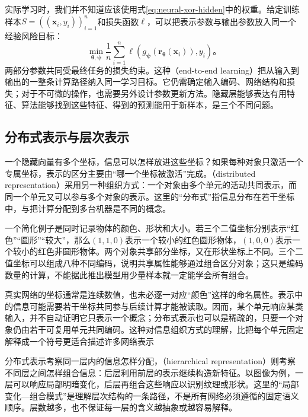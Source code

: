 实际学习时，我们并不知道应该使用式\eqref{eq:neural-xor-hidden}中的权重。给定训练样本$S=((\bm{x}_i,y_i))_{i=1}^{n}$和损失函数$\ell$，可以把表示参数与输出参数放入同一个经验风险目标：
\begin{equation}
  \min_{\bm{\theta},\bm{\psi}}
  \frac{1}{n}\sum_{i=1}^{n}
  \ell\!\left(g_{\bm{\psi}}(\bm{r}_{\bm{\theta}}(\bm{x}_i)),y_i\right)\text{。}
  \label{eq:neural-joint-learning}
\end{equation}
两部分参数共同受最终任务的损失约束。这种（end-to-end learning）把从输入到输出的一整条计算路径纳入同一学习目标。它仍需确定输入编码、网络结构和损失；对于不可微的操作，也需要另外设计参数更新方法。隐藏层能够表达有用特征、算法能够找到这些特征、得到的预测能用于新样本，是三个不同问题。

\subsection{分布式表示与层次表示}
\label{sec:neural-distributed-hierarchical}

一个隐藏向量有多个坐标，信息可以怎样放进这些坐标？如果每种对象只激活一个专属坐标，表示的区分主要由“哪一个坐标被激活”完成。（distributed representation）采用另一种组织方式：一个对象由多个单元的活动共同表示，而同一个单元又可以参与多个对象的表示。这里的“分布式”指信息分布在若干坐标中，与把计算分配到多台机器是不同的概念。

一个简化例子是同时记录物体的颜色、形状和大小。若三个二值坐标分别表示“红色”“圆形”“较大”，那么$(1,1,0)$表示一个较小的红色圆形物体，$(1,0,0)$表示一个较小的红色非圆形物体。两个对象共享部分坐标，又在形状坐标上不同。三个二值坐标可以组成八种不同编码，说明共享属性能够通过组合区分对象；这只是编码数量的计算，不能据此推出模型用少量样本就一定能学会所有组合。

真实网络的坐标通常是连续数值，也未必逐一对应“颜色”这样的命名属性。表示中的信息可能需要若干坐标共同参与后续计算才能被读取。因而，某个单元响应某类输入，并不自动证明它只表示一个概念；分布式表示也可以是稀疏的，只要一个对象仍由若干可复用单元共同编码。这种对信息组织方式的理解，比把每个单元固定解释成一个符号更适合描述许多网络表示

分布式表示考察同一层内的信息怎样分配，（hierarchical representation）则考察不同层之间怎样组合信息：后层利用前层的表示继续构造新特征。以图像为例，一层可以响应局部明暗变化，后层再组合这些响应以识别纹理或形状。这里的“局部变化—组合模式”是理解层次结构的一条路径，不是所有网络必须遵循的固定语义顺序。层数越多，也不保证每一层的含义越抽象或越容易解释。

